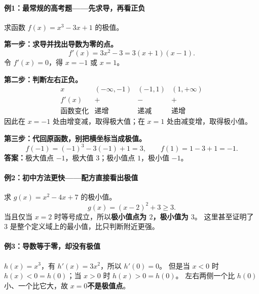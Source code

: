 \clearpage
\begin{examplebox}
\begin{minipage}{\linewidth}
\paragraph{例1：最常规的高考题——先求导，再看正负}
\begin{center}\end{center}
\end{minipage}


求函数 $f(x)=x^3-3x+1$ 的极值。

\textbf{第一步：求导并找出导数为零的点。}
\[
f'(x)=3x^2-3=3(x+1)(x-1).
\]
令 $f'(x)=0$，得 $x=-1$ 或 $x=1$。

\textbf{第二步：判断左右正负。}
\[
\begin{array}{c|ccc}
x&(-\infty,-1)&(-1,1)&(1,+\infty)\\ \hline
f'(x)&+&-&+\\
\text{函数变化}&\text{递增}&\text{递减}&\text{递增}
\end{array}
\]
因此在 $x=-1$ 处由增变减，取得极大值；在 $x=1$ 处由减变增，取得极小值。

\textbf{第三步：代回原函数，别把横坐标当成极值。}
\[
f(-1)=(-1)^3-3(-1)+1=3,
\qquad f(1)=1-3+1=-1.
\]
\textbf{答案：}极大值点 $-1$，极大值 $3$；极小值点 $1$，极小值 $-1$。

\end{examplebox}
\clearpage
\begin{examplebox}
\paragraph{例2：初中方法更快——配方直接看出极值}
\begin{center}\end{center}

求 $g(x)=x^2-4x+7$ 的极小值。
\[
g(x)=(x-2)^2+3\ge3.
\]
当且仅当 $x=2$ 时等号成立，所以\textbf{极小值点为 $2$，极小值为 $3$}。
这里甚至证明了 $3$ 是整个定义域上的最小值，比只判断附近更强。

\end{examplebox}
\clearpage
\begin{examplebox}
\paragraph{例3：导数等于零，却没有极值}
\begin{center}\end{center}

$h(x)=x^3$，有 $h'(x)=3x^2$，所以 $h'(0)=0$。
但是当 $x<0$ 时 $h(x)<0=h(0)$；当 $x>0$ 时 $h(x)>0=h(0)$。
左右两侧一个比 $h(0)$ 小、一个比它大，故 $x=0$\textbf{不是极值点}。

\end{examplebox}
